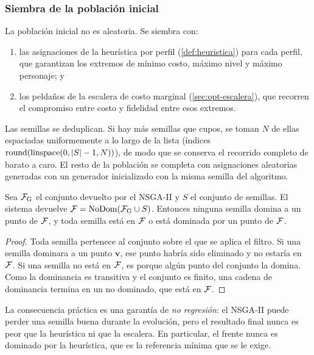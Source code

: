 \subsubsection{Siembra de la población inicial}
\label{sec:opt-siembra}

La población inicial no es aleatoria. Se siembra con:
\begin{enumerate}
  \item las asignaciones de la heurística por perfil
        (\cref{def:heuristica}) para cada perfil, que garantizan los extremos
        de mínimo costo, máximo nivel y máximo personaje; y
  \item los peldaños de la escalera de costo marginal
        (\cref{sec:opt-escalera}), que recorren el compromiso entre costo y
        fidelidad entre esos extremos.
\end{enumerate}
Las semillas se deduplican. Si hay más semillas que cupos, se toman $N$ de
ellas espaciadas uniformemente a lo largo de la lista (índices
$\mathrm{round}(\mathrm{linspace}(0,\left\lvert S \right\rvert-1,N))$), de modo que se conserva
el recorrido completo de barato a caro. El resto de la población se completa
con asignaciones aleatorias generadas con un generador inicializado con la
misma semilla del algoritmo.

\begin{proposicion}
\label{prop:siembra}
Sea $\mathcal{F}_{\mathrm{G}}$ el conjunto devuelto por el NSGA-II y $S$ el
conjunto de semillas. El sistema devuelve
$\mathcal{F}=\mathrm{NoDom}(\mathcal{F}_{\mathrm{G}}\cup S)$. Entonces ninguna semilla
domina a un punto de $\mathcal{F}$, y toda semilla está en $\mathcal{F}$ o está dominada
por un punto de $\mathcal{F}$.
\end{proposicion}

\begin{proof}
Toda semilla pertenece al conjunto sobre el que se aplica el filtro. Si una
semilla dominara a un punto $\mathbf{v}$, ese punto habría sido eliminado y no
estaría en $\mathcal{F}$. Si una semilla no está en $\mathcal{F}$, es porque algún punto
del conjunto la domina. Como la dominancia es transitiva y el conjunto es
finito, una cadena de dominancia termina en un no dominado, que está en
$\mathcal{F}$.
\end{proof}

La consecuencia práctica es una garantía de \emph{no regresión}: el NSGA-II
puede perder una semilla buena durante la evolución, pero el resultado final
nunca es peor que la heurística ni que la escalera. En particular, el frente
nunca es dominado por la heurística, que es la referencia mínima que se le
exige.

